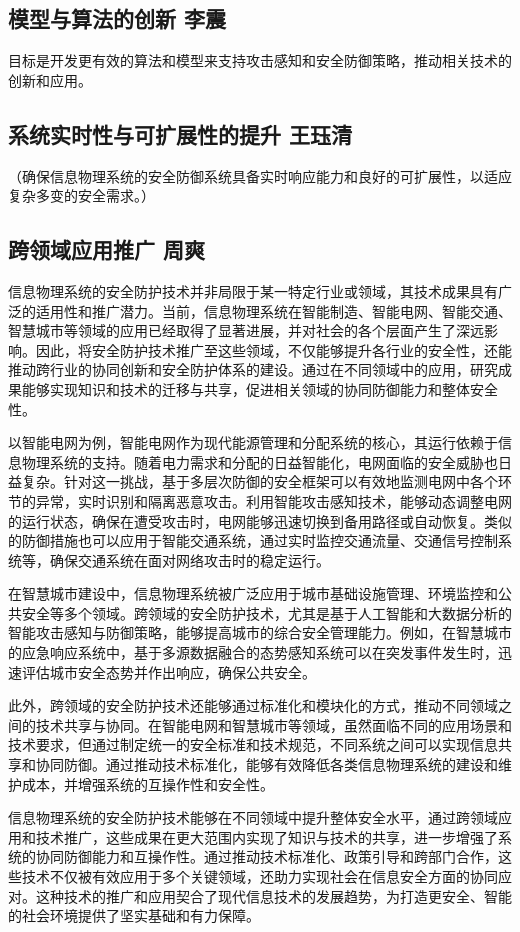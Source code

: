 \subsection{模型与算法的创新 李震}

目标是开发更有效的算法和模型来支持攻击感知和安全防御策略，推动相关技术的创新和应用。

\subsection{系统实时性与可扩展性的提升 王珏清}

（确保信息物理系统的安全防御系统具备实时响应能力和良好的可扩展性，以适应复杂多变的安全需求。）

\subsection{跨领域应用推广 周爽}

信息物理系统的安全防护技术并非局限于某一特定行业或领域，其技术成果具有广泛的适用性和推广潜力。当前，信息物理系统在智能制造、智能电网、智能交通、智慧城市等领域的应用已经取得了显著进展，并对社会的各个层面产生了深远影响。因此，将安全防护技术推广至这些领域，不仅能够提升各行业的安全性，还能推动跨行业的协同创新和安全防护体系的建设。通过在不同领域中的应用，研究成果能够实现知识和技术的迁移与共享，促进相关领域的协同防御能力和整体安全性。

以智能电网为例，智能电网作为现代能源管理和分配系统的核心，其运行依赖于信息物理系统的支持。随着电力需求和分配的日益智能化，电网面临的安全威胁也日益复杂。针对这一挑战，基于多层次防御的安全框架可以有效地监测电网中各个环节的异常，实时识别和隔离恶意攻击。利用智能攻击感知技术，能够动态调整电网的运行状态，确保在遭受攻击时，电网能够迅速切换到备用路径或自动恢复。类似的防御措施也可以应用于智能交通系统，通过实时监控交通流量、交通信号控制系统等，确保交通系统在面对网络攻击时的稳定运行。

在智慧城市建设中，信息物理系统被广泛应用于城市基础设施管理、环境监控和公共安全等多个领域。跨领域的安全防护技术，尤其是基于人工智能和大数据分析的智能攻击感知与防御策略，能够提高城市的综合安全管理能力。例如，在智慧城市的应急响应系统中，基于多源数据融合的态势感知系统可以在突发事件发生时，迅速评估城市安全态势并作出响应，确保公共安全。

此外，跨领域的安全防护技术还能够通过标准化和模块化的方式，推动不同领域之间的技术共享与协同。在智能电网和智慧城市等领域，虽然面临不同的应用场景和技术要求，但通过制定统一的安全标准和技术规范，不同系统之间可以实现信息共享和协同防御。通过推动技术标准化，能够有效降低各类信息物理系统的建设和维护成本，并增强系统的互操作性和安全性。

信息物理系统的安全防护技术能够在不同领域中提升整体安全水平，通过跨领域应用和技术推广，这些成果在更大范围内实现了知识与技术的共享，进一步增强了系统的协同防御能力和互操作性。通过推动技术标准化、政策引导和跨部门合作，这些技术不仅被有效应用于多个关键领域，还助力实现社会在信息安全方面的协同应对。这种技术的推广和应用契合了现代信息技术的发展趋势，为打造更安全、智能的社会环境提供了坚实基础和有力保障。

